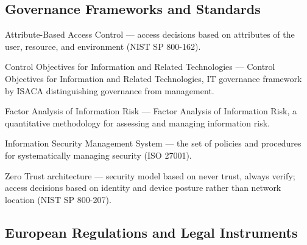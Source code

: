 \subsection*{Governance Frameworks and Standards}

\begin{description}[style=nextline, leftmargin=2.5cm, font=\normalfont\bfseries]
    \item[\glstarget{abac}ABAC] Attribute-Based Access Control --- access decisions based on attributes of the user, resource, and environment (NIST SP 800-162).
    \item[\glstarget{cobit}COBIT] Control Objectives for Information and Related Technologies --- Control Objectives for Information and Related Technologies, IT governance framework by ISACA distinguishing governance from management.
    \item[\glstarget{fair}FAIR] Factor Analysis of Information Risk --- Factor Analysis of Information Risk, a quantitative methodology for assessing and managing information risk.
    \item[\glstarget{isms}ISMS] Information Security Management System --- the set of policies and procedures for systematically managing security (ISO 27001).
    \item[\glstarget{zt}Zero Trust] Zero Trust architecture --- security model based on never trust, always verify; access decisions based on identity and device posture rather than network location (NIST SP 800-207).
\end{description}

\subsection*{European Regulations and Legal Instruments}

